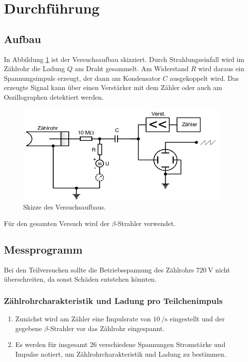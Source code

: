 \section{Durchführung}
\label{sec:Durchführung}

\subsection{Aufbau}

In Abbildung \ref{fig:VA} ist der Versuchsaufbau skizziert.
Durch Strahlungseinfall wird im Zählrohr die Ladung $Q$ am Draht gesammelt.
Am Widerstand $R$ wird daraus ein Spannungsimpuls erzeugt, der dann am
Kondensator $C$ ausgekoppelt wird. Das erzeugte Signal kann über einen
Verstärker mit dem Zähler oder auch am Oszillographen detektiert werden.

\begin{figure}
  \centering
  \includegraphics[height=5cm]{MeinePics;)/VA.png}
  \caption{Skizze des Versuchsaufbaus.\cite{anleitung}}
  \label{fig:VA}
\end{figure}

Für den gesamten Versuch wird der $\beta$-Strahler  verwendet.

\subsection{Messprogramm}

Bei den Teilversuchen sollte die Betriebsspannung des Zählrohrs
$\SI{720}{\volt}$ nicht überschreiten, da sonst Schäden entstehen könnten.

\subsubsection{Zählrohrcharakteristik und Ladung pro Teilchenimpuls}
\begin{enumerate}
  \item Zunächst wird am Zähler eine Impulsrate von $\SI{10}{\per\second}$ eingestellt
  und der gegebene $\beta$-Strahler vor das Zählrohr eingespannt.
  \item Es werden für insgesamt 26 verschiedene Spannungen Stromstärke und
  Impulse notiert, um Zählrohrcharakteristik und Ladung zu bestimmen.
\end{enumerate}

